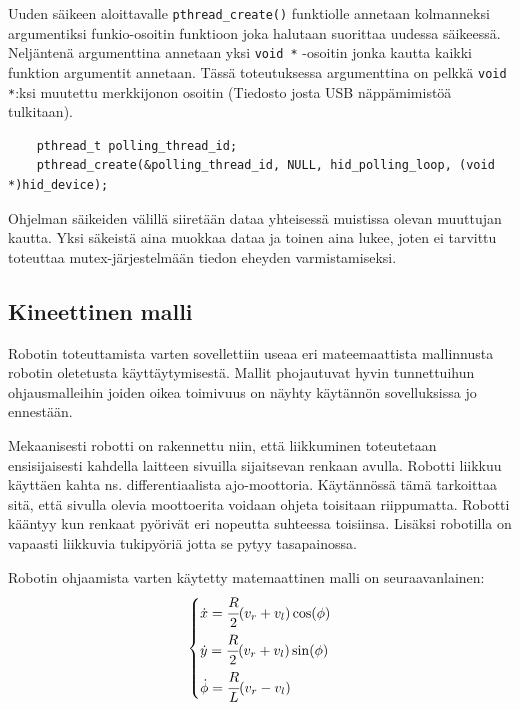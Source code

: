 \documentclass[]{article} %
\numberwithin{equation}{section}
\numberwithin{figure}{section}
\numberwithin{table}{section}
\begin{document}
Uuden säikeen aloittavalle \verb+pthread_create()+ funktiolle annetaan kolmanneksi argumentiksi funkio-osoitin funktioon joka halutaan suorittaa uudessa säikeessä. Neljäntenä argumenttina annetaan yksi \verb+void *+ -osoitin jonka kautta kaikki funktion argumentit annetaan. Tässä toteutuksessa argumenttina on pelkkä \verb+void *+:ksi muutettu merkkijonon osoitin (Tiedosto josta USB näppämimistöä tulkitaan).

\begin{verbatim}
    pthread_t polling_thread_id;
    pthread_create(&polling_thread_id, NULL, hid_polling_loop, (void *)hid_device);
\end{verbatim}

Ohjelman säikeiden välillä siiretään dataa yhteisessä muistissa olevan muuttujan kautta. Yksi säkeistä aina muokkaa dataa ja toinen aina lukee, joten ei tarvittu toteuttaa mutex-järjestelmään tiedon eheyden varmistamiseksi.


 

\subsection{Kineettinen malli}
\label{sub:Kineettinen malli}

Robotin toteuttamista varten sovellettiin useaa eri mateemaattista mallinnusta robotin oletetusta käyttäytymisestä.
Mallit phojautuvat hyvin tunnettuihun ohjausmalleihin joiden oikea toimivuus on näyhty käytännön sovelluksissa jo ennestään.

Mekaanisesti robotti on rakennettu niin, että liikkuminen toteutetaan ensisijaisesti kahdella laitteen sivuilla sijaitsevan renkaan avulla.
Robotti liikkuu käyttäen kahta ns. differentiaalista ajo-moottoria.
Käytännössä tämä tarkoittaa sitä, että sivulla olevia moottoerita voidaan ohjeta toisitaan riippumatta.
Robotti kääntyy kun renkaat pyörivät eri nopeutta suhteessa toisiinsa.
Lisäksi robotilla on vapaasti liikkuvia tukipyöriä jotta se pytyy tasapainossa.

Robotin ohjaamista varten käytetty matemaattinen malli on seuraavanlainen:
\begin{align}
    \label{equ:diff-drive-implementation}
    \begin{dcases}
        \dot x = \cfrac{R}{2} (v_r + v_l) \cos (\phi)\\
        \dot y = \cfrac{R}{2} (v_r + v_l) \sin (\phi)\\
        \dot \phi = \cfrac{R}{L} (v_r - v_l)   
    \end{dcases}
\end{align}
\end{document}
